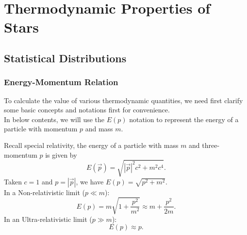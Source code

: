 \chapter{Thermodynamic Properties of Stars}

\section{Statistical Distributions}
\subsection{Energy-Momentum Relation}
To calculate the value of various thermodynamic quantities, we need first clarify some basic concepts and notations first for convenience. \\

In below contents, we will use the $E(p)$ notation to represent the energy of a particle with momentum $p$ and mass $m$.
\begin{foundation}
    Recall special relativity, the energy of a particle with mass $m$ and three-momentum $p$ is given by
    \[
        E(\vec{p}) = \sqrt{|\vec{p}|^2c^2 + m^2c^4}.
    \]
    Taken $c = 1$ and $p = |\vec{p}|$, we have $E(p) = \sqrt{p^2 + m^2}$. \\

    In a Non-relativistic limit ($p \ll m$):
    \[
        E(p) = m \sqrt{1 + \frac{p^2}{m^2}} \approx m + \frac{p^2}{2m}.
    \]
    In an Ultra-relativistic limit ($p \gg m$):
    \[
        E(p)  \approx p.
    \]
\end{foundation}

\bigskip\noindent

